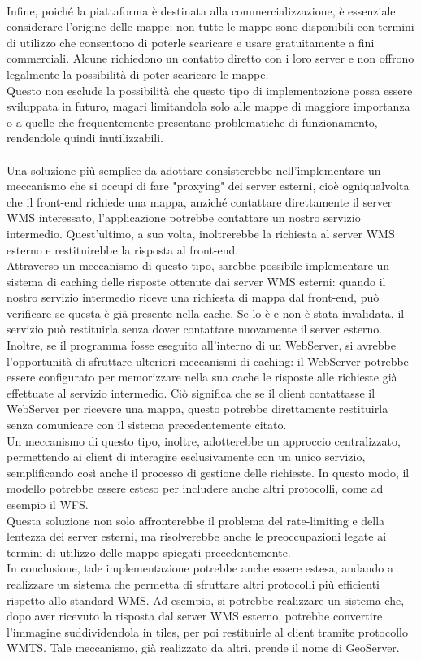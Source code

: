 \\Infine, poiché la piattaforma è destinata alla commercializzazione, è essenziale considerare l'origine delle mappe: non tutte le mappe sono disponibili con termini di utilizzo che consentono di poterle scaricare e usare gratuitamente a fini commerciali. Alcune richiedono un contatto diretto con i loro server e non offrono legalmente la possibilità di poter scaricare le mappe.
\\Questo non esclude la possibilità che questo tipo di implementazione possa essere sviluppata in futuro, magari limitandola solo alle mappe di maggiore importanza o a quelle che frequentemente presentano problematiche di funzionamento, rendendole quindi inutilizzabili.
\\~\\
Una soluzione più semplice da adottare consisterebbe nell'implementare un meccanismo che si occupi di fare "proxying" dei server esterni, cioè ogniqualvolta che il front-end richiede una mappa, anziché contattare direttamente il server WMS interessato, l'applicazione potrebbe contattare un nostro servizio intermedio. Quest'ultimo, a sua volta, inoltrerebbe la richiesta al server WMS esterno e restituirebbe la risposta al front-end. 
\\Attraverso un meccanismo di questo tipo, sarebbe possibile implementare un sistema di caching delle risposte ottenute dai server WMS esterni: quando il nostro servizio intermedio riceve una richiesta di mappa dal front-end, può verificare se questa è già presente nella cache. Se lo è e non è stata invalidata, il servizio può restituirla  senza dover contattare nuovamente il server esterno.
\\Inoltre, se il programma fosse eseguito all'interno di un WebServer, si avrebbe l'opportunità di sfruttare ulteriori meccanismi di caching: il WebServer potrebbe essere configurato per memorizzare nella sua cache le risposte alle richieste già effettuate al servizio intermedio. Ciò significa che se il client contattasse il WebServer per ricevere una mappa, questo potrebbe direttamente restituirla senza comunicare con il sistema precedentemente citato.
\\Un meccanismo di questo tipo, inoltre, adotterebbe un approccio centralizzato, permettendo ai client di interagire esclusivamente con un unico servizio, semplificando così anche il processo di gestione delle richieste. In questo modo, il modello potrebbe essere esteso per includere anche altri protocolli, come ad esempio il WFS.
\\Questa soluzione non solo affronterebbe il problema del rate-limiting e della lentezza dei server esterni, ma risolverebbe anche le preoccupazioni legate ai termini di utilizzo delle mappe spiegati precedentemente.
\\In conclusione, tale implementazione potrebbe anche essere estesa, andando a realizzare un sistema che permetta di sfruttare altri protocolli più efficienti rispetto allo standard WMS. Ad esempio, si potrebbe realizzare un sistema che, dopo aver ricevuto la risposta dal server WMS esterno, potrebbe convertire l'immagine suddividendola in tiles, per poi restituirle al client tramite protocollo WMTS. Tale meccanismo, già realizzato da altri, prende il nome di GeoServer.

